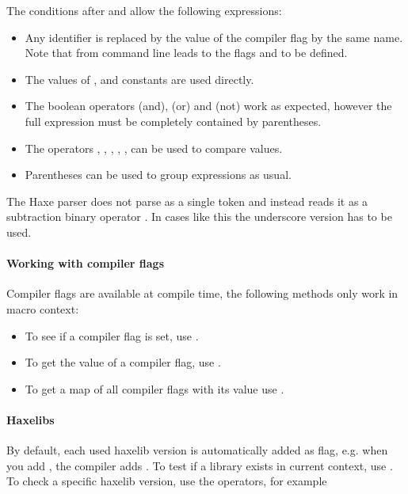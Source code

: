 The conditions after  and  allow the following expressions:

\begin{itemize}
	\item Any identifier is replaced by the value of the compiler flag by the same name. Note that  from command line leads to the flags  and  to be defined.
	\item The values of ,  and  constants are used directly.
		\item The boolean operators \expr{\&\&} (and), \expr{||} (or) and \expr{!} (not) work as expected, however the full expression must be completely contained by parentheses.
	\item The operators \expr{==}, \expr{!=}, \expr{>}, \expr{>=}, \expr{<}, \expr{<=} can be used to compare values.
	\item Parentheses \expr{()} can be used to group expressions as usual.
\end{itemize}

The Haxe parser does not parse  as a single token and instead reads it as a subtraction binary operator . In cases like this the underscore version  has to be used.

\paragraph{Working with compiler flags}
Compiler flags are available at compile time, the following methods only work in macro context:
\begin{itemize}
	\item To see if a compiler flag is set, use .
	\item To get the value of a compiler flag, use .
	\item To get a map of all compiler flags with its value use .
\end{itemize}

\paragraph{Haxelibs}
By default, each used haxelib version is automatically added as flag, e.g. when you add , the compiler adds . To test if a library exists in current context, use . To check a specific haxelib version, use the operators, for example 

